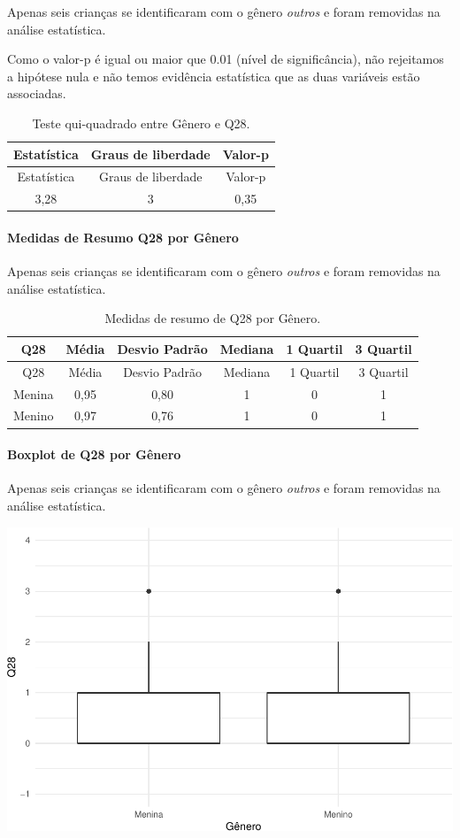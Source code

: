 \documentclass[]{article}
\let\oldparagraph\paragraph
\renewcommand{\paragraph}[1]{\oldparagraph{#1}\mbox{}}
\begin{document}
Apenas seis crianças se identificaram com o gênero \emph{outros} e foram removidas na análise estatística.

Como o valor-p é igual ou maior que 0.01 (nível de significância), não rejeitamos a hipótese nula e não temos evidência estatística que as duas variáveis estão associadas.

\begin{longtable}[]{@{}ccc@{}}
\caption{\label{tab:unnamed-chunk-852}Teste qui-quadrado entre Gênero e Q28.}\tabularnewline
\toprule
Estatística & Graus de liberdade & Valor-p\tabularnewline
\midrule
\endfirsthead
\toprule
Estatística & Graus de liberdade & Valor-p\tabularnewline
\midrule
\endhead
3,28 & 3 & 0,35\tabularnewline
\bottomrule
\end{longtable}

\cleardoublepage

\hypertarget{medidas-de-resumo-q28-por-guxeanero}{%
\paragraph{Medidas de Resumo Q28 por Gênero}\label{medidas-de-resumo-q28-por-guxeanero}}

Apenas seis crianças se identificaram com o gênero \emph{outros} e foram removidas na análise estatística.

\begin{longtable}[]{@{}cccccc@{}}
\caption{\label{tab:unnamed-chunk-853}Medidas de resumo de Q28 por Gênero.}\tabularnewline
\toprule
Q28 & Média & Desvio Padrão & Mediana & 1 Quartil & 3 Quartil\tabularnewline
\midrule
\endfirsthead
\toprule
Q28 & Média & Desvio Padrão & Mediana & 1 Quartil & 3 Quartil\tabularnewline
\midrule
\endhead
Menina & 0,95 & 0,80 & 1 & 0 & 1\tabularnewline
Menino & 0,97 & 0,76 & 1 & 0 & 1\tabularnewline
\bottomrule
\end{longtable}

\hypertarget{boxplot-de-q28-por-guxeanero}{%
\paragraph{Boxplot de Q28 por Gênero}\label{boxplot-de-q28-por-guxeanero}}

Apenas seis crianças se identificaram com o gênero \emph{outros} e foram removidas na análise estatística.

\begin{center}\includegraphics[width=0.75\linewidth]{relatorio_covid19_files/figure-latex/unnamed-chunk-854-1} \end{center}
\end{document}
